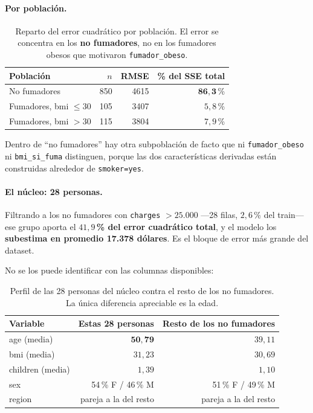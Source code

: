 \documentclass[11pt,a4paper]{article}
\newcommand{\destacado}[1]{\textcolor{azulserie}{\textbf{#1}}}
\begin{document}
\begin{sloppypar}
\paragraph{Por población.}

\begin{table}[H]
\centering
\caption{Reparto del error cuadrático por población. El error se concentra en los
\textbf{no fumadores}, no en los fumadores obesos que motivaron \texttt{fumador\_obeso}.}
\begin{tabular}{lrrr}
\toprule
\textbf{Población} & \textbf{$n$} & \textbf{RMSE} & \textbf{\% del SSE total} \\
\midrule
No fumadores               & 850 & 4615 & $\mathbf{86{,}3}$\,\% \\
Fumadores, bmi $\leq 30$   & 105 & 3407 & $5{,}8$\,\% \\
Fumadores, bmi $> 30$      & 115 & 3804 & $7{,}9$\,\% \\
\bottomrule
\end{tabular}
\end{table}

Dentro de ``no fumadores'' hay otra subpoblación de facto que ni \texttt{fumador\_obeso} ni
\texttt{bmi\_si\_fuma} distinguen, porque las dos características derivadas están construidas
alrededor de \texttt{smoker=yes}.
\end{sloppypar}

\paragraph{El núcleo: 28 personas.} Filtrando a los no fumadores con \texttt{charges}
$>25.000$ ---28 filas, $2{,}6$\,\% del train--- ese grupo aporta el \destacado{$41{,}9$\,\% del
error cuadrático total}, y el modelo los \destacado{subestima en promedio 17.378 dólares}. Es
el bloque de error más grande del dataset.

No se los puede identificar con las columnas disponibles:

\begin{table}[H]
\centering
\caption{Perfil de las 28 personas del núcleo contra el resto de los no fumadores. La única
diferencia apreciable es la edad.}
\begin{tabular}{lrr}
\toprule
\textbf{Variable} & \textbf{Estas 28 personas} & \textbf{Resto de los no fumadores} \\
\midrule
age (media)      & $\mathbf{50{,}79}$ & $39{,}11$ \\
bmi (media)      & $31{,}23$ & $30{,}69$ \\
children (media) & $1{,}39$ & $1{,}10$ \\
sex              & 54\,\% F / 46\,\% M & 51\,\% F / 49\,\% M \\
region           & pareja a la del resto & pareja a la del resto \\
\bottomrule
\end{tabular}
\end{table}
\end{document}
